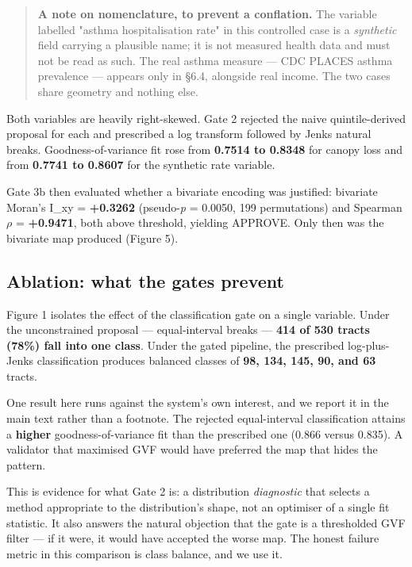 \begin{quote}\small
\textbf{A note on nomenclature, to prevent a conflation.} The variable labelled "asthma hospitalisation rate" in this controlled case is a \emph{synthetic} field carrying a plausible name; it is not measured health data and must not be read as such. The real asthma measure --- CDC PLACES asthma prevalence --- appears only in \S{}6.4, alongside real income. The two cases share geometry and nothing else.\\
\end{quote}
Both variables are heavily right-skewed. Gate 2 rejected the naive quintile-derived proposal for each and prescribed a log transform followed by Jenks natural breaks. Goodness-of-variance fit rose from \textbf{0.7514 to 0.8348} for canopy loss and from \textbf{0.7741 to 0.8607} for the synthetic rate variable.

Gate 3b then evaluated whether a bivariate encoding was justified: bivariate Moran's I\_xy = \textbf{+0.3262} (pseudo-\emph{p} = 0.0050, 199 permutations) and Spearman $\rho$ = \textbf{+0.9471}, both above threshold, yielding APPROVE. Only then was the bivariate map produced (Figure 5).

\subsection{Ablation: what the gates prevent}
Figure 1 isolates the effect of the classification gate on a single variable. Under the unconstrained proposal --- equal-interval breaks --- \textbf{414 of 530 tracts (78\%) fall into one class}. Under the gated pipeline, the prescribed log-plus-Jenks classification produces balanced classes of \textbf{98, 134, 145, 90, and 63} tracts.

One result here runs against the system's own interest, and we report it in the main text rather than a footnote. The rejected equal-interval classification attains a \textbf{higher} goodness-of-variance fit than the prescribed one (0.866 versus 0.835). A validator that maximised GVF would have preferred the map that hides the pattern.

This is evidence for what Gate 2 is: a distribution \emph{diagnostic} that selects a method appropriate to the distribution's shape, not an optimiser of a single fit statistic. It also answers the natural objection that the gate is a thresholded GVF filter --- if it were, it would have accepted the worse map. The honest failure metric in this comparison is class balance, and we use it.

